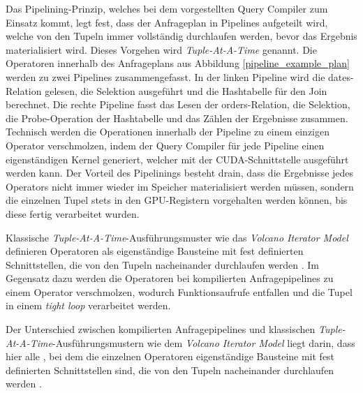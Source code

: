 Das Pipelining-Prinzip, welches bei dem vorgestellten Query Compiler zum Einsatz kommt, legt fest, dass der Anfrageplan in Pipelines aufgeteilt wird, welche von den Tupeln immer vollständig durchlaufen werden, bevor das Ergebnis materialisiert wird.
Dieses Vorgehen wird \emph{Tuple-At-A-Time} genannt.
Die Operatoren innerhalb des Anfrageplans aus Abbildung \ref{pipeline_example_plan} werden zu zwei Pipelines zusammengefasst.
In der linken Pipeline wird die \textsf{dates}-Relation gelesen, die Selektion ausgeführt und die Hashtabelle für den Join berechnet.
Die rechte Pipeline fasst das Lesen der \textsf{orders}-Relation, die Selektion, die Probe-Operation der Hashtabelle und das Zählen der Ergebnisse zusammen.
Technisch werden die Operationen innerhalb der Pipeline zu einem einzigen Operator verschmolzen, indem der Query Compiler für jede Pipeline einen eigenständigen Kernel generiert, welcher mit der CUDA-Schnittstelle ausgeführt werden kann.
Der Vorteil des Pipelinings besteht drain, dass die Ergebnisse jedes Operators nicht immer wieder im Speicher materialisiert werden müssen, sondern die einzelnen Tupel stets in den GPU-Registern vorgehalten werden können, bis diese fertig verarbeitet wurden.

Klassische \emph{Tuple-At-A-Time}-Ausführungsmuster wie das \emph{Volcano Iterator Model} definieren Operatoren als eigenständige Bausteine mit fest definierten Schnittstellen, die von den Tupeln nacheinander durchlaufen werden \cite{Graefe1994}.
Im Gegensatz dazu werden die Operatoren bei kompilierten Anfragepipelines zu einem Operator verschmolzen, wodurch Funktionsaufrufe entfallen und die Tupel in einem \emph{tight loop} \cite{Neumann2011} verarbeitet werden.

Der Unterschied zwischen kompilierten Anfragepipelines und klassischen \emph{Tuple-At-A-Time}-Ausführungsmustern wie dem \emph{Volcano Iterator Model} liegt darin, dass hier alle , bei dem die einzelnen Operatoren eigenständige Bausteine mit fest definierten Schnittstellen sind, die von den Tupeln nacheinander durchlaufen werden \cite{Graefe1994}.


